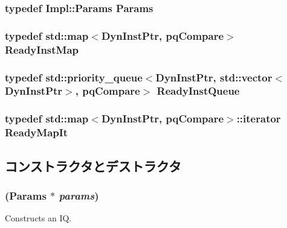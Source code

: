 \label{classInstQueue_a0e9597437fae9e60d5449933949416ec}
\hypertarget{classInstQueue_a818e103eae798a24a06a0a34631849ea}{
\subsubsection[{Params}]{\setlength{\rightskip}{0pt plus 5cm}typedef Impl::Params {\bf Params}}}
\label{classInstQueue_a818e103eae798a24a06a0a34631849ea}
\hypertarget{classInstQueue_afca3a0ab9af7309428eb77c726724000}{
\subsubsection[{ReadyInstMap}]{\setlength{\rightskip}{0pt plus 5cm}typedef std::map$<${\bf DynInstPtr}, {\bf pqCompare}$>$ {\bf ReadyInstMap}}}
\label{classInstQueue_afca3a0ab9af7309428eb77c726724000}
\hypertarget{classInstQueue_a60636ae8f3b649078c4f1bdd3b20dcad}{
\subsubsection[{ReadyInstQueue}]{\setlength{\rightskip}{0pt plus 5cm}typedef std::priority\_\-queue$<${\bf DynInstPtr}, {\bf std::vector}$<${\bf DynInstPtr}$>$, {\bf pqCompare}$>$ {\bf ReadyInstQueue}}}
\label{classInstQueue_a60636ae8f3b649078c4f1bdd3b20dcad}
\hypertarget{classInstQueue_a2ab2a44e2b7c4b408ceda3a9a2422ecb}{
\subsubsection[{ReadyMapIt}]{\setlength{\rightskip}{0pt plus 5cm}typedef std::map$<${\bf DynInstPtr}, {\bf pqCompare}$>$::iterator {\bf ReadyMapIt}}}
\label{classInstQueue_a2ab2a44e2b7c4b408ceda3a9a2422ecb}


\subsection{コンストラクタとデストラクタ}
\hypertarget{classInstQueue_a679ee5512f178ea331ab7cd3ebf2aa78}{
\subsubsection[{InstQueue}]{ ({\bf Params} $\ast$ {\em params})}}
\label{classInstQueue_a679ee5512f178ea331ab7cd3ebf2aa78}
Constructs an IQ. 


